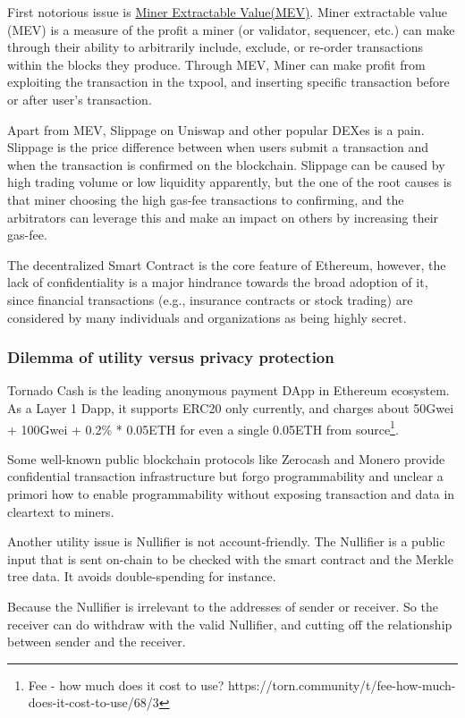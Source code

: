 \documentclass{article}
\begin{document}
First notorious issue is \href{https://ethereum.org/en/developers/docs/mev/}{Miner Extractable Value(MEV)}. Miner extractable value (MEV) is a measure of the profit a miner (or validator, sequencer, etc.) can make through their ability to arbitrarily include, exclude, or re-order transactions within the blocks they produce.  Through MEV, Miner can make profit from exploiting the transaction in the txpool, and inserting specific transaction before or after user's transaction.

Apart from MEV, Slippage on Uniswap and other popular DEXes is a pain. Slippage is the price difference between when users submit a transaction and when the transaction is confirmed on the blockchain. Slippage can be caused by high trading volume or low liquidity apparently, but the one of the root causes is that miner choosing the high gas-fee transactions to confirming, and the arbitrators can leverage this and make an impact on others by increasing their gas-fee.

The decentralized Smart Contract is the core feature of Ethereum, however, the lack of confidentiality is a major hindrance towards the broad adoption of it, since financial transactions (e.g., insurance contracts or stock trading) are considered by many individuals and organizations as being highly secret. 

\subsubsection{Dilemma of utility versus privacy protection}

Tornado Cash is the leading anonymous payment DApp in Ethereum ecosystem. As a Layer 1 Dapp, it supports ERC20 only currently, and charges about 50Gwei + 100Gwei + 0.2\% * 0.05ETH for even a single 0.05ETH from source\footnote{Fee - how much does it cost to use? https://torn.community/t/fee-how-much-does-it-cost-to-use/68/3}.

Some well-known public blockchain protocols like Zerocash and Monero provide confidential transaction infrastructure but forgo programmability and unclear a primori how to enable programmability without exposing transaction and data in cleartext to miners.

Another utility issue is Nullifier is not account-friendly. The Nullifier is a public input that is sent on-chain to be checked with the smart contract and the Merkle tree data. It avoids double-spending for instance.

Because the Nullifier is irrelevant to the addresses of sender or receiver. So the receiver can do withdraw with the valid Nullifier, and cutting off the relationship between sender and the receiver.
\end{document}
